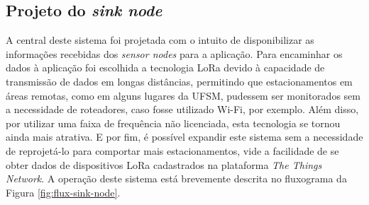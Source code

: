 \documentclass[oneside,openright,12pt]{ufsm_2015} %
\begin{document}
    
    
    
    \subsection{Projeto do \textit{sink node}}
    A central deste sistema foi projetada com o intuito de disponibilizar as informações recebidas dos \textit{sensor nodes} para a aplicação. Para encaminhar os dados à aplicação foi escolhida a tecnologia LoRa devido à capacidade de transmissão de dados em longas distâncias, permitindo que estacionamentos em áreas remotas, como em alguns lugares da UFSM, pudessem ser monitorados sem a necessidade de roteadores, caso fosse utilizado Wi-Fi, por exemplo. Além disso, por utilizar uma faixa de frequência não licenciada, esta tecnologia se tornou ainda mais atrativa. E por fim, é possível expandir este sistema sem a necessidade de reprojetá-lo para comportar mais estacionamentos, vide a facilidade de se obter dados de dispositivos LoRa cadastrados na plataforma \textit{The Things Network}. A operação deste sistema está brevemente descrita no fluxograma da Figura \ref{fig:flux-sink-node}.
    
\end{document}

